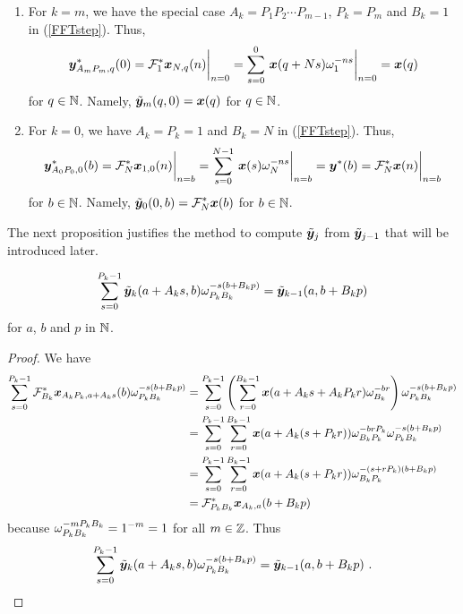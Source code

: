 \begin{rmkList}
\begin{enumerate}
\item For $k=m$, we have the special case $A_k=P_1 P_2 \cdots P_{m-1}$,
$P_k = P_m$ and $B_k=1$ in (\ref{FFTstep}).  Thus,
\[
\bm{y}^\ast_{A_m P_m,q}(0) = \mathcal{F}^\ast_1 \bm{x}_{N, q}(n) \bigg|_{n=0}
= \sum_{s=0}^{0}\, \bm{x}(q+Ns) \omega_1^{-ns}\bigg|_{n=0} = \bm{x}(q)
\]
for $q \in \mathbb{N}$.  Namely, $\displaystyle \tilde{\bm{y}}_m(q,0) = \bm{x}(q)$ for
$q \in \mathbb{N}$.
\item For $k=0$, we have $A_k = P_k = 1$ and $B_k = N$ in
(\ref{FFTstep}).  Thus,
\[
\bm{y}^\ast_{A_0 P_0, 0}(b) = \mathcal{F}^\ast_N \bm{x}_{1,0}(n) \bigg|_{n=b}
= \sum_{s=0}^{N-1}\, \bm{x}(s) \omega_N^{-ns}\bigg|_{n=b}
= \bm{y}^\ast(b)
= \mathcal{F}^\ast_N \bm{x}(n)\bigg|_{n=b}
\]
for $b \in \mathbb{N}$.  Namely,
$\displaystyle \tilde{\bm{y}}_0(0,b) = \mathcal{F}^\ast_N \bm{x}(b)$
for $b \in \mathbb{N}$.
\end{enumerate}
\end{rmkList}

The next proposition justifies the method to compute $\tilde{\bm{y}}_j$ from
$\tilde{\bm{y}}_{j-1}$ that will be introduced later.

\begin{prop}
\[
\sum_{s=0}^{P_k-1} \tilde{\bm{y}}_k(a+A_k s, b) \omega_{P_k B_k}^{-s(b+B_k p)}
= \tilde{\bm{y}}_{k-1}(a, b+B_k p)
\]
for $a$, $b$ and $p$ in $\mathbb{N}$.
\label{heart_of_FFT}
\end{prop}

\begin{proof}
We have
\begin{align*}
\sum_{s=0}^{P_k-1} \mathcal{F}^\ast_{B_k} \bm{x}_{A_k P_k,a+A_k s } (b) 
\omega_{P_k B_k}^{-s(b+B_k p)}
&= \sum_{s=0}^{P_k-1} \left( \sum_{r=0}^{B_k-1} \bm{x}(a+A_k s + A_k P_k r)
\omega_{B_k}^{-br} \right) \omega_{P_k B_k}^{-s(b+B_k p)}  \\
&= \sum_{s=0}^{P_k-1} \sum_{r=0}^{B_k-1} \bm{x}(a+ A_k (s + P_k r))
\omega_{B_k P_k}^{-brP_k} \omega_{P_k B_k}^{-s(b+B_k p)}  \\
&= \sum_{s=0}^{P_k-1} \sum_{r=0}^{B_k-1} \bm{x}(a+ A_k (s + P_k r))
\omega_{B_k P_k}^{-(s+rP_k)(b+B_k p)}  \\
&= \mathcal{F}^\ast_{P_kB_k}\bm{x}_{A_k,a} (b+B_k p)
\end{align*}
because $\displaystyle \omega_{P_kB_k}^{-mP_kB_k} = 1^{-m} = 1$ for
all $m\in \mathbb{Z}$.  Thus
\[
\sum_{s=0}^{P_k-1} \tilde{\bm{y}}_k(a+A_k s, b) \omega_{P_k B_k}^{-s(b+B_k p)}
= \tilde{\bm{y}}_{k-1}(a, b+B_k p) \ .  \qedhere
\]
\end{proof}

